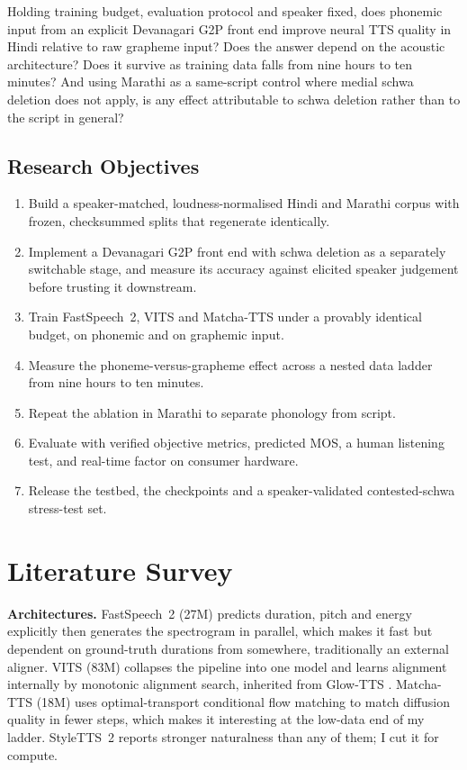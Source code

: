 \documentclass[12pt,a4paper]{article}
\begin{document}
Holding training budget, evaluation protocol and speaker fixed, does phonemic
input from an explicit Devanagari G2P front end improve neural TTS quality in
Hindi relative to raw grapheme input? Does the answer depend on the acoustic
architecture? Does it survive as training data falls from nine hours to ten
minutes? And using Marathi as a same-script control where medial schwa deletion
does not apply, is any effect attributable to schwa deletion rather than to the
script in general?

\subsection{Research Objectives}

\begin{enumerate}[leftmargin=*, label=O\arabic*., itemsep=1pt, topsep=2pt]
\item Build a speaker-matched, loudness-normalised Hindi and Marathi corpus
with frozen, checksummed splits that regenerate identically.
\item Implement a Devanagari G2P front end with schwa deletion as a separately
switchable stage, and measure its accuracy against elicited speaker judgement
before trusting it downstream.
\item Train FastSpeech~2, VITS and Matcha-TTS under a provably identical
budget, on phonemic and on graphemic input.
\item Measure the phoneme-versus-grapheme effect across a nested data ladder
from nine hours to ten minutes.
\item Repeat the ablation in Marathi to separate phonology from script.
\item Evaluate with verified objective metrics, predicted MOS, a human
listening test, and real-time factor on consumer hardware.
\item Release the testbed, the checkpoints and a speaker-validated
contested-schwa stress-test set.
\end{enumerate}

\section{Literature Survey}

\textbf{Architectures.} FastSpeech~2 \cite{ren2021fastspeech2} (27M) predicts
duration, pitch and energy explicitly then generates the spectrogram in
parallel, which makes it fast but dependent on ground-truth durations from
somewhere, traditionally an external aligner. VITS \cite{kim2021vits} (83M)
collapses the pipeline into one model and learns alignment internally by
monotonic alignment search, inherited from Glow-TTS \cite{kim2020glowtts}.
Matcha-TTS \cite{mehta2024matcha} (18M) uses optimal-transport conditional flow
matching to match diffusion quality in fewer steps, which makes it interesting
at the low-data end of my ladder. StyleTTS~2 \cite{li2023styletts2} reports
stronger naturalness than any of them; I cut it for compute.
\end{document}
